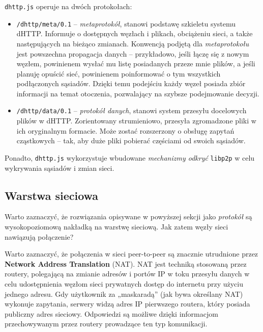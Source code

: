 \texttt{dhttp.js} operuje na dwóch protokołach:

\begin{itemize}
    \item \texttt{/dhttp/meta/0.1} -- {\em metaprotokół}, stanowi podstawę szkieletu systemu dHTTP. Informuje o dostępnych węzłach i plikach, obciążeniu sieci, a także następujących na bieżąco zmianach. Konwencją podjętą dla {\em metaprotokołu} jest powszechna propagacja danych -- przykładowo, jeśli łączę się z nowym węzłem, powinienem wysłać mu listę posiadanych przeze mnie plików, a jeśli planuję opuścić sieć, powinienem poinformować o tym wszystkich podłączonych sąsiadów. Dzięki temu podejściu każdy węzeł posiada zbiór informacji na temat otoczenia, pozwalający na szybsze podejmowanie decyzji.

    \item \texttt{/dhttp/data/0.1} -- {\em protokół danych}, stanowi system przesyłu docelowych plików w dHTTP. Zorientowany strumieniowo, przesyła zgromadzone pliki w ich oryginalnym formacie. Może zostać rozszerzony o obsługę zapytań cząstkowych -- tak, aby duże pliki pobierać częściami od swoich sąsiadów.
\end{itemize}
Ponadto, \texttt{dhttp.js} wykorzystuje wbudowane {\em mechanizmy odkryć} \texttt{libp2p} w celu wykrywania sąsiadów i zmian sieci.



\subsection{Warstwa sieciowa}
Warto zaznaczyć, że rozwiązania opisywane w powyższej sekcji jako {\em protokół} są wysokopoziomową nakładką na warstwę sieciową. Jak zatem węzły sieci nawiązują połączenie?

Warto zaznaczyć, że połączenia w sieci peer-to-peer są znacznie utrudnione przez \textbf{ Network Address Translation} (NAT). NAT jest techniką stosowaną przez routery, polegającą na zmianie adresów i portów IP w toku przesyłu danych w celu udostępnienia węzłom sieci prywatnych dostęp do internetu przy użyciu jednego adresu. Gdy użytkownik za „maskaradą” (jak bywa określany NAT) wykonuje zapytania, serwery widzą adres IP pierwszego routera, który posiada publiczny adres sieciowy. Odpowiedzi są możliwe dzięki informacjom przechowywanym przez routery prowadzące ten typ komunikacji.

